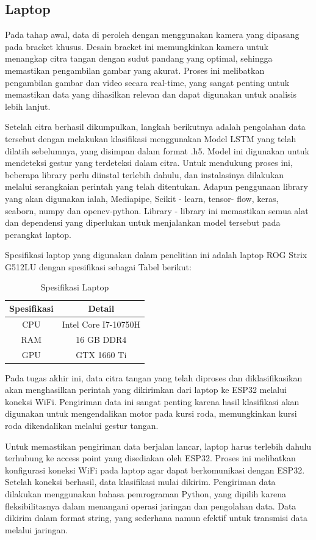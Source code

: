 \subsection{Laptop}
Pada tahap awal, data di peroleh dengan menggunakan kamera yang dipasang pada bracket khusus. Desain bracket ini memungkinkan kamera untuk menangkap citra tangan dengan sudut pandang yang optimal, sehingga memastikan pengambilan gambar yang akurat. Proses ini melibatkan pengambilan gambar dan video secara real-time, yang sangat penting untuk memastikan data yang dihasilkan relevan dan dapat digunakan untuk analisis lebih lanjut.

Setelah citra berhasil dikumpulkan, langkah berikutnya adalah pengolahan data tersebut dengan melakukan klasifikasi menggunakan Model LSTM yang telah dilatih sebelumnya, yang disimpan dalam format .h5. Model ini digunakan untuk mendeteksi gestur yang terdeteksi dalam citra. Untuk mendukung proses ini, beberapa library perlu diinstal terlebih dahulu, dan instalasinya dilakukan melalui serangkaian perintah yang telah ditentukan. Adapun penggunaan library yang akan digunakan ialah, Mediapipe, Scikit - learn, tensor-
flow, keras, seaborn, numpy dan opencv-python. Library - library ini memastikan semua alat dan dependensi yang diperlukan untuk menjalankan model tersebut pada perangkat laptop.

Spesifikasi laptop yang digunakan dalam penelitian ini adalah laptop ROG Strix G512LU dengan spesifikasi sebagai Tabel berikut:
\begin{table}[ht]
\centering
\begin{tabular}{|c|c|}
\hline
\textbf{Spesifikasi} & \textbf{Detail} \\ \hline
CPU & Intel Core I7-10750H \\ \hline
RAM & 16 GB DDR4\\ \hline
GPU & GTX 1660 Ti \\ \hline
\end{tabular}
\caption{Spesifikasi Laptop}
\label{tab:spec_laptop}
\end{table}
Pada tugas akhir ini, data citra tangan yang telah diproses dan diklasifikasikan akan menghasilkan perintah yang dikirimkan dari laptop ke ESP32 melalui koneksi WiFi. Pengiriman data ini sangat penting karena hasil klasifikasi akan digunakan untuk mengendalikan motor pada kursi roda, memungkinkan kursi roda dikendalikan melalui gestur tangan.

Untuk memastikan pengiriman data berjalan lancar, laptop harus terlebih dahulu terhubung ke access point yang disediakan oleh ESP32. Proses ini melibatkan konfigurasi koneksi WiFi pada laptop agar dapat berkomunikasi dengan ESP32. Setelah koneksi berhasil, data klasifikasi mulai dikirim. Pengiriman data dilakukan menggunakan bahasa pemrograman Python, yang dipilih karena fleksibilitasnya dalam menangani operasi jaringan dan pengolahan data. Data dikirim dalam format string, yang sederhana namun efektif untuk transmisi data melalui jaringan.

